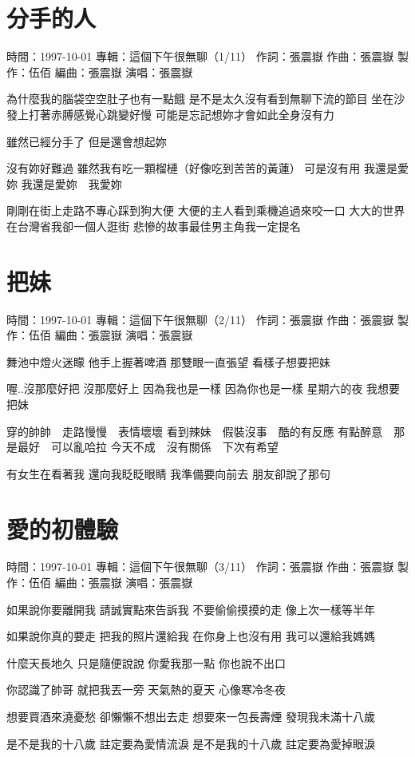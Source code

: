 \documentclass[UTF8,a4paper,oneside,twocolumn,12pt]{ctexbook}
\newcommand{\infopair}[2]{\textbullet #1：#2}
\newcommand{\zc}[1][伍佰]{\infopair{作詞}{#1}}
\newcommand{\zq}[1][伍佰]{\infopair{作曲}{#1}}
\newcommand{\bq}[1][伍佰]{\infopair{編曲}{#1}}
\newcommand{\zj}[1]{\infopair{專輯}{#1}}
\newcommand{\zz}[1]{\infopair{製作}{#1}}
\newcommand{\sj}[1]{\infopair{時間}{#1}}
\newenvironment{info}{\begin{flushleft}\kaishu
	}
	{\end{flushleft}\normalsize\yahei\par}
\newenvironment{lyric}{
	}
{}
\begin{document}
\section{分手的人}
\begin{info}
	\sj{1997-10-01}
	\zj{這個下午很無聊（1/11）}
	\zc[張震嶽]
	\zq[張震嶽]
	\zz{伍佰}
	\bq[張震嶽]
	\infopair{演唱}{張震嶽}
\end{info}
\begin{lyric}
	為什麼我的腦袋空空肚子也有一點餓
	是不是太久沒有看到無聊下流的節目
	坐在沙發上打著赤膊感覺心跳變好慢
	可能是忘記想妳才會如此全身沒有力

	雖然已經分手了 但是還會想起妳

	沒有妳好難過
	雖然我有吃一顆榴槤（好像吃到苦苦的黃蓮）
	可是沒有用 我還是愛妳
	我還是愛妳　我愛妳

	剛剛在街上走路不專心踩到狗大便
	大便的主人看到乘機追過來咬一口
	大大的世界在台灣省我卻一個人逛街
	悲慘的故事最佳男主角我一定提名
\end{lyric}

\section{把妹}
\begin{info}
	\sj{1997-10-01}
	\zj{這個下午很無聊（2/11）}
	\zc[張震嶽]
	\zq[張震嶽]
	\zz{伍佰}
	\bq[張震嶽]
	\infopair{演唱}{張震嶽}
\end{info}
\begin{lyric}
	舞池中燈火迷矇 他手上握著啤酒
	那雙眼一直張望 看樣子想要把妹

	喔..沒那麼好把 沒那麼好上
	因為我也是一樣 因為你也是一樣
	星期六的夜 我想要把妹

	穿的帥帥　走路慢慢　表情壞壞
	看到辣妹　假裝沒事　酷的有反應
	有點醉意　那是最好　可以亂哈拉
	今天不成　沒有關係　下次有希望

	有女生在看著我 還向我眨眨眼睛
	我準備要向前去 朋友卻說了那句
\end{lyric}

\section{愛的初體驗}
\begin{info}
	\sj{1997-10-01}
	\zj{這個下午很無聊（3/11）}
	\zc[張震嶽]
	\zq[張震嶽]
	\zz{伍佰}
	\bq[張震嶽]
	\infopair{演唱}{張震嶽}
\end{info}
\begin{lyric}
	如果說你要離開我
	請誠實點來告訴我
	不要偷偷摸摸的走
	像上次一樣等半年

	如果說你真的要走
	把我的照片還給我
	在你身上也沒有用
	我可以還給我媽媽

	什麼天長地久
	只是隨便說說
	你愛我那一點
	你也說不出口

	你認識了帥哥
	就把我丟一旁
	天氣熱的夏天
	心像寒冷冬夜

	想要買酒來澆憂愁
	卻懶懶不想出去走
	想要來一包長壽煙
	發現我未滿十八歲

	是不是我的十八歲
	註定要為愛情流淚
	是不是我的十八歲
	註定要為愛掉眼淚
\end{lyric}
\end{document}
